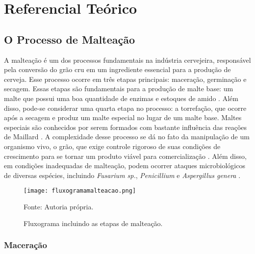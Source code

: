 \chapter[Referencial Teórico]{Referencial Teórico}

\section{O Processo de Malteação}

A malteação é um dos processos fundamentais na indústria cervejeira, responsável pela conversão do grão cru em um ingrediente essencial para a produção de cerveja. Esse processo ocorre em três etapas principais: maceração, germinação e secagem. Essas etapas são fundamentais para a produção de malte base: um malte que possui uma boa quantidade de enzimas e estoques de amido \cite{BRIGGS2004,CENCI2021}. Além disso, pode-se considerar uma quarta etapa no processo: a torrefação, que ocorre após a secagem e produz um malte especial no lugar de um malte base. Maltes especiais são conhecidos por serem formados com bastante influência das reações de Maillard \cite{COGHE2004}. A complexidade desse processo se dá no fato da manipulação de um organismo vivo, o grão, que exige controle rigoroso de suas condições de crescimento para se tornar um produto viável para comercialização \cite{MALLETT2022}. Além disso, em condições inadequadas de malteação, podem ocorrer ataques microbiológicos de diversas espécies, incluindo \textit{Fusarium sp.}, \textit{Penicillium} e \textit{Aspergillus genera} \cite{LUARASI2016}.

\begin{figure}[ht]
    \centering
    \caption{Fluxograma incluindo as etapas de malteação.}
    \label{fig:fluxogramamalteacao}
    \texttt{[image: fluxogramamalteacao.png]}

    {\centering\footnotesize Fonte: Autoria própria.\par}
\end{figure}

\subsection{Maceração}

